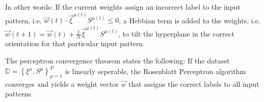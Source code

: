 In other words: If the current weights assign an incorrect label to the input pattern, i.e. \(\vec{w}(t)\cdot\vec{\xi}^{\mu(t)}S^{\mu(t)} \leq 0\), a Hebbian term is added to the weights, i.e. \(\vec{w}(t + 1) = \vec{w}(t) + \frac{1}{N}\vec{\xi}^{\mu(t)}S^{\mu(t)}\), to tilt the hyperplane in the correct orientation for that particular input pattern.

The perceptron convergence theorem\cite{perceptron_slides1} states the following:
If the dataset \(\mathbb{D} = \left\{ \xi^\mu, S^\mu \right\} _{\mu=1}^{P}\) is linearly seperable, the Rosenblatt Perceptron algorithm converges and yields a weight vector \(\vec{w}\) that assigns the correct labels to all input patterns.